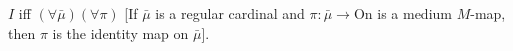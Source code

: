 $I$ iff $(\forall \bar{\mu})(\forall \pi)$ [If $\bar{\mu}$ is a regular cardinal and $\pi: \bar{\mu} \rightarrow \text{On}$ is a medium $M$-map, then $\pi$ is the identity map on $\bar{\mu}$].
